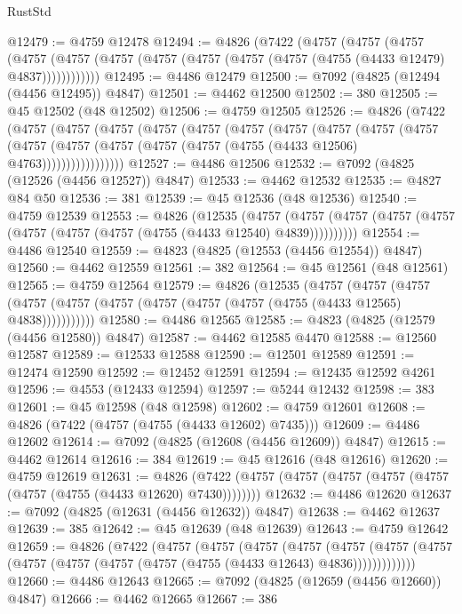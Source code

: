 \begin{lexlean}{RustStd}
\begin{coremodule}
@12479 := @4759 @12478
@12494 := @4826
    (@7422
      (@4757
        (@4757
          (@4757
            (@4757 (@4757 (@4757 (@4757 (@4757 (@4757 (@4757 (@4755 (@4433 @12479) @4837))))))))))))
@12495 := @4486 @12479
@12500 := @7092 (@4825 (@12494 (@4456 @12495)) @4847)
@12501 := @4462 @12500
@12502 := 380
@12505 := @45 @12502 (@48 @12502)
@12506 := @4759 @12505
@12526 := @4826
    (@7422
      (@4757
        (@4757
          (@4757
            (@4757
              (@4757
                (@4757
                  (@4757
                    (@4757
                      (@4757
                        (@4757
                          (@4757
                            (@4757 (@4757 (@4757 (@4757 (@4755 (@4433 @12506) @4763)))))))))))))))))
@12527 := @4486 @12506
@12532 := @7092 (@4825 (@12526 (@4456 @12527)) @4847)
@12533 := @4462 @12532
@12535 := @4827 @84 @50
@12536 := 381
@12539 := @45 @12536 (@48 @12536)
@12540 := @4759 @12539
@12553 := @4826
    (@12535
      (@4757 (@4757 (@4757 (@4757 (@4757 (@4757 (@4757 (@4757 (@4755 (@4433 @12540) @4839))))))))))
@12554 := @4486 @12540
@12559 := @4823 (@4825 (@12553 (@4456 @12554)) @4847)
@12560 := @4462 @12559
@12561 := 382
@12564 := @45 @12561 (@48 @12561)
@12565 := @4759 @12564
@12579 := @4826
    (@12535
      (@4757
        (@4757
          (@4757 (@4757 (@4757 (@4757 (@4757 (@4757 (@4757 (@4755 (@4433 @12565) @4838)))))))))))
@12580 := @4486 @12565
@12585 := @4823 (@4825 (@12579 (@4456 @12580)) @4847)
@12587 := @4462 @12585 @4470
@12588 := @12560 @12587
@12589 := @12533 @12588
@12590 := @12501 @12589
@12591 := @12474 @12590
@12592 := @12452 @12591
@12594 := @12435 @12592 @4261
@12596 := @4553 (@12433 @12594)
@12597 := @5244 @12432
@12598 := 383
@12601 := @45 @12598 (@48 @12598)
@12602 := @4759 @12601
@12608 := @4826 (@7422 (@4757 (@4755 (@4433 @12602) @7435)))
@12609 := @4486 @12602
@12614 := @7092 (@4825 (@12608 (@4456 @12609)) @4847)
@12615 := @4462 @12614
@12616 := 384
@12619 := @45 @12616 (@48 @12616)
@12620 := @4759 @12619
@12631 := @4826 (@7422 (@4757 (@4757 (@4757 (@4757 (@4757 (@4757 (@4755 (@4433 @12620) @7430))))))))
@12632 := @4486 @12620
@12637 := @7092 (@4825 (@12631 (@4456 @12632)) @4847)
@12638 := @4462 @12637
@12639 := 385
@12642 := @45 @12639 (@48 @12639)
@12643 := @4759 @12642
@12659 := @4826
    (@7422
      (@4757
        (@4757
          (@4757
            (@4757
              (@4757
                (@4757 (@4757 (@4757 (@4757 (@4757 (@4757 (@4755 (@4433 @12643) @4836)))))))))))))
@12660 := @4486 @12643
@12665 := @7092 (@4825 (@12659 (@4456 @12660)) @4847)
@12666 := @4462 @12665
@12667 := 386

\end{coremodule}
\end{lexlean}
